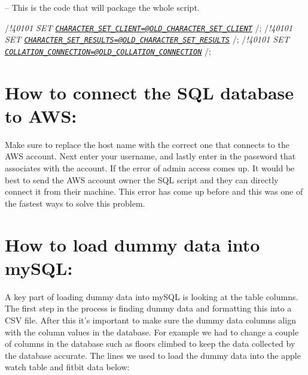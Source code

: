 \documentclass[]{book}
\begin{document}
-- This is the code that will package the whole script.

/\emph{!40101 SET
\href{mailto:CHARACTER_SET_CLIENT=@OLD_CHARACTER_SET_CLIENT}{\nolinkurl{CHARACTER\_SET\_CLIENT=@OLD\_CHARACTER\_SET\_CLIENT}}
}/; /\emph{!40101 SET
\href{mailto:CHARACTER_SET_RESULTS=@OLD_CHARACTER_SET_RESULTS}{\nolinkurl{CHARACTER\_SET\_RESULTS=@OLD\_CHARACTER\_SET\_RESULTS}}
}/; /\emph{!40101 SET
\href{mailto:COLLATION_CONNECTION=@OLD_COLLATION_CONNECTION}{\nolinkurl{COLLATION\_CONNECTION=@OLD\_COLLATION\_CONNECTION}}
}/;

\section{How to connect the SQL database to
AWS:}\label{how-to-connect-the-sql-database-to-aws}

Make sure to replace the host name with the correct one that connects to
the AWS account. Next enter your username, and lastly enter in the
password that associates with the account. If the error of admin access
comes up. It would be best to send the AWS account owner the SQL script
and they can directly connect it from their machine. This error has come
up before and this was one of the fastest ways to solve this problem.

\section{How to load dummy data into
mySQL:}\label{how-to-load-dummy-data-into-mysql}

A key part of loading dummy data into mySQL is looking at the table
columns. The first step in the process is finding dummy data and
formatting this into a CSV file. After this it's important to make sure
the dummy data columns align with the column values in the database. For
example we had to change a couple of columns in the database such as
floors climbed to keep the data collected by the database accurate. The
lines we used to load the dummy data into the apple watch table and
fitbit data below:
\end{document}
